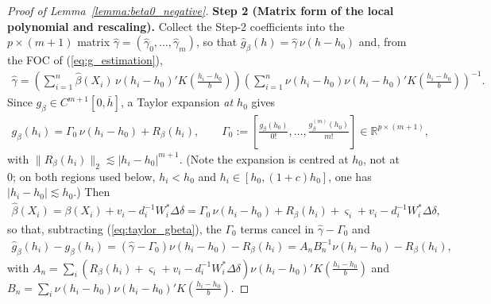 \documentclass{article}
\newcommand{\normm}[1]{\lVert#1\rVert}
\newcommand{\R}{\mathbb{R}}
\begin{document}
\begin{appendices}
\begin{proof}[Proof of Lemma~\ref{lemma:beta0_negative}]
\textbf{Step 2 (Matrix form of the local polynomial and rescaling).}
Collect the Step-2 coefficients into the $p\times(m+1)$ matrix
$\hat\gamma=(\hat\gamma_0,\dots,\hat\gamma_m)$, so that
$\hat g_\beta(h)=\hat\gamma\,\nu(h-h_0)$ and, from the FOC of
(\ref{eq:g_estimation}),
\begin{align*}
    \hat{\gamma} =\left(\sum_{i=1}^n\hat{\beta}(X_i)\,\nu(h_i-h_0)'
        K\!\left(\tfrac{h_i-h_0}{b}\right)\right)
        \left(\sum_{i=1}^n \nu(h_i-h_0)\nu(h_i-h_0)'
        K\!\left(\tfrac{h_i-h_0}{b}\right)\right)^{-1}.
\end{align*}
Since $g_\beta\in C^{m+1}[0,\bar h]$, a Taylor expansion \emph{at $h_0$} gives
\begin{align}\label{eq:taylor_gbeta}
    g_{\beta}(h_i) = \Gamma_0\,\nu(h_i-h_0) + R_{\beta}(h_i),
    \qquad
    \Gamma_0:=\left[\frac{g_{\beta}(h_0)}{0!},\dots,\frac{g_{\beta}^{(m)}(h_0)}{m!}\right]
    \in\R^{p\times(m+1)},
\end{align}
with $\normm{R_{\beta}(h_i)}_2\lesssim |h_i-h_0|^{m+1}$. (Note the expansion is
centred at $h_0$, not at $0$; on both regions used below,
$h_i<h_0$ and $h_i\in[h_0,(1+c)h_0]$, one has $|h_i-h_0|\lesssim h_0$.)
Then
\begin{align*}
    \hat{\beta}(X_i)
    = \beta(X_i) + v_i - d_i^{-1}W_i^{*}\Delta \delta
    = \Gamma_0\,\nu(h_i-h_0) + R_{\beta}(h_i) + \varsigma_i + v_i
      - d_i^{-1}W_i^{*}\Delta \delta ,
\end{align*}
so that, subtracting (\ref{eq:taylor_gbeta}), the $\Gamma_0$ terms cancel in
$\hat\gamma-\Gamma_0$ and
\begin{align*}
    \hat{g}_\beta(h_i) - g_\beta(h_i)
    = \left(\hat\gamma-\Gamma_0\right)\nu(h_i-h_0)-R_\beta(h_i)
    = A_n B_n^{-1}\nu(h_i-h_0)-R_{\beta}(h_i),
\end{align*}
with
$A_n=\sum_i\left(R_{\beta}(h_i)+\varsigma_i+v_i-d_i^{-1}W_i^{*}\Delta\delta\right)
\nu(h_i-h_0)'K(\tfrac{h_i-h_0}{b})$ and
$B_n=\sum_i\nu(h_i-h_0)\nu(h_i-h_0)'K(\tfrac{h_i-h_0}{b})$.
 

\end{proof}
\end{appendices}
\end{document}
